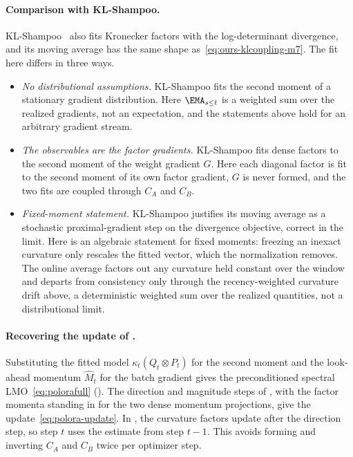 \paragraph{Comparison with KL-Shampoo.} KL-Shampoo~\cite{klshampoo} also
fits Kronecker factors with the log-determinant divergence, and its moving
average has the same shape as~\eqref{eq:ours-klcoupling-m7}. The fit here
differs in three ways.
\begin{itemize}[leftmargin=1.5em,itemsep=1pt,topsep=2pt]
  \item \emph{No distributional assumptions.} KL-Shampoo fits the second
  moment of a stationary gradient distribution. Here $\EMA_{s \leq t}$ is a
  weighted sum over the realized gradients, not an expectation, and the
  statements above hold for an arbitrary gradient stream.
  \item \emph{The observables are the factor gradients.} KL-Shampoo fits
  dense factors to the second moment of the weight gradient $G$. Here
  each diagonal factor is fit to the second moment of its own factor
  gradient, $G$ is never formed, and the two fits are coupled through
  $C_A$ and $C_B$.
  \item \emph{Fixed-moment statement.} KL-Shampoo justifies its
  moving average as a stochastic proximal-gradient step on the divergence
  objective, correct in the limit. Here  is an
  algebraic statement for fixed moments: freezing an inexact curvature only
  rescales the fitted vector, which the normalization removes. The online
  average factors out any curvature held constant over the window and departs
  from consistency only through the recency-weighted curvature drift above, a
  deterministic weighted sum over the realized quantities, not a
  distributional limit.
\end{itemize}

\paragraph{Recovering the update of .} Substituting the
fitted model $\kappa_t(Q_t\otimes P_t)$ for the second moment and the
look-ahead momentum $\widehat M_t$ for the batch gradient gives the
preconditioned spectral LMO~\eqref{eq:polorafull}
(). The direction and magnitude steps of
, with the factor momenta standing in for the two
dense momentum projections, give the update~\eqref{eq:polora-update}. In
, the curvature factors update after the direction step, so
step $t$ uses the estimate from step $t-1$. This avoids forming and
inverting $C_A$ and $C_B$ twice per optimizer step.


